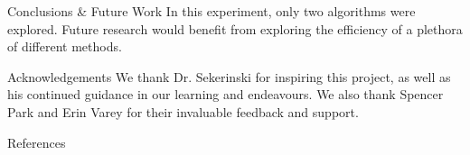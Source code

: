 \documentclass[22pt]{beamer}
\begin{document}
\begin{frame}[fragile]
\begin{textblock}{7.25}
\begin{block}{Conclusions \& Future Work}
In this experiment, only two algorithms were explored. Future research would benefit from exploring the efficiency of a plethora of different methods.
\end{block}


\begin{block}{Acknowledgements}
We thank Dr. Sekerinski for inspiring this project, as well as his continued guidance in our learning and endeavours. We also thank Spencer Park and Erin Varey for their invaluable feedback and support. 
\end{block}

\begin{block}{References}

{\scriptsize
}
\end{block}

\end{textblock}

%
%

\end{frame}
\end{document}
